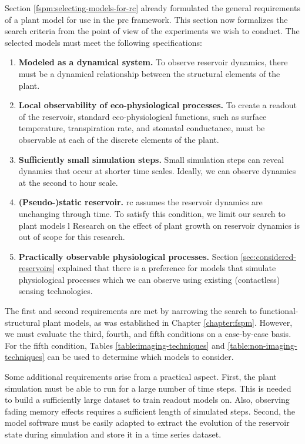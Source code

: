 
Section \ref{fspm:selecting-models-for-rc} already formulated the general requirements of a plant model for use in the \acrshort{prc} framework.
This section now formalizes the search criteria from the point of view of the experiments we wish to conduct. 
The selected models must meet the following specifications:

\begin{enumerate}
    \item \textbf{Modeled as a dynamical system.} To observe reservoir dynamics, there must be a dynamical relationship between the structural elements of the plant.
    \item \textbf{Local observability of eco-physiological processes.} To create a readout of the reservoir, standard eco-physiological functions, such as surface temperature, transpiration rate, and stomatal conductance, must be observable at each of the discrete elements of the plant.
    \item \textbf{Sufficiently small simulation steps.} Small simulation steps can reveal dynamics that occur at shorter time scales. Ideally, we can observe dynamics at the second to hour scale.
    \item \textbf{(Pseudo-)static reservoir.} \acrlong{rc} assumes the reservoir dynamics are unchanging through time. To satisfy this condition, we limit our search to plant models l Research on the effect of plant growth on reservoir dynamics is out of scope for this research.
    \item \textbf{Practically observable physiological processes.} Section \ref{sec:considered-reservoirs} explained that there is a preference for models that simulate physiological processes which we can observe using existing (contactless) sensing technologies. 
\end{enumerate}

The first and second requirements are met by narrowing the search to functional-structural plant models, as was established in Chapter \ref{chapter:fspm}.
However, we must evaluate the third, fourth, and fifth conditions on a case-by-case basis.
For the fifth condition, Tables \ref{table:imaging-techniques} and \ref{table:non-imaging-techniques} can be used to determine which models to consider.


Some additional requirements arise from a practical aspect. 
First, the plant simulation must be able to run for a large number of time steps. 
This is needed to build a sufficiently large dataset to train readout models on. 
Also, observing fading memory effects requires a sufficient length of simulated steps.
Second, the model software must be easily adapted to extract the evolution of the reservoir state during simulation and store it in a time series dataset.